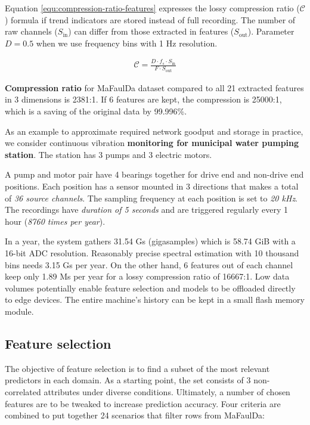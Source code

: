 Equation \ref{equ:compression-ratio-features} expresses the lossy compression ratio ($\mathcal{C}$) formula if trend indicators are stored instead of full recording. The number of raw channels ($S_{\mathrm{in}}$) can differ from those extracted in features ($S_{\mathrm{out}}$). Parameter $D = 0.5$ when we use frequency bins with 1 Hz resolution.

\begin{ceqn}\begin{align} \label{equ:compression-ratio-features}
\mathcal{C} = \frac{D \cdot f_s \cdot S_{\mathrm{in}}}{F \cdot S_{\mathrm{out}}}
\end{align}\end{ceqn}

\textbf{Compression ratio} for MaFaulDa dataset compared to all 21 extracted features in 3 dimensions is 2381:1. If 6 features are kept, the compression is 25000:1, which is a saving of the original data by 99.996\%.

As an example to approximate required network goodput and storage in practice, we consider continuous vibration \textbf{monitoring for municipal water pumping station}. The station has 3 pumps and 3 electric motors. 

A pump and motor pair have 4 bearings together for drive end and non-drive end positions. Each position has a sensor mounted in 3 directions that makes a total of \emph{36 source channels}. The sampling frequency at each position is set to \emph{20 kHz}. The recordings have \emph{duration of 5 seconds} and are triggered regularly every 1 hour (\emph{8760 times per year}).

In a year, the system gathers 31.54 Gs (gigasamples) which is 58.74 GiB with a 16-bit ADC resolution. Reasonably precise spectral estimation with 10 thousand bins needs 3.15 Gs per year. On the other hand, 6 features out of each channel keep only 1.89 Ms per year for a lossy compression ratio of 16667:1. Low data volumes potentially enable feature selection and models to be offloaded directly to edge devices. The entire machine's history can be kept in a small flash memory module.

\subsection{Feature selection}
The objective of feature selection is to find a subset of the most relevant predictors in each domain. As a starting point, the set consists of 3 non-correlated attributes under diverse conditions. Ultimately, a number of chosen features are to be tweaked to increase prediction accuracy. Four criteria are combined to put together 24 scenarios that filter rows from MaFaulDa:

